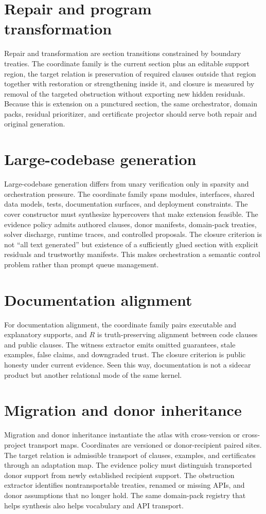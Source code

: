 \documentclass[11pt]{report}
\begin{document}
\section{Repair and program transformation}
Repair and transformation are section transitions constrained by boundary treaties. The coordinate family is the current section plus an editable support region, the target relation is preservation of required clauses outside that region together with restoration or strengthening inside it, and closure is measured by removal of the targeted obstruction without exporting new hidden residuals. Because this is extension on a punctured section, the same orchestrator, domain packs, residual prioritizer, and certificate projector should serve both repair and original generation.
\section{Large-codebase generation}
Large-codebase generation differs from unary verification only in sparsity and orchestration pressure. The coordinate family spans modules, interfaces, shared data models, tests, documentation surfaces, and deployment constraints. The cover constructor must synthesize hypercovers that make extension feasible. The evidence policy admits authored clauses, donor manifests, domain-pack treaties, solver discharge, runtime traces, and controlled proposals. The closure criterion is not ``all text generated'' but existence of a sufficiently glued section with explicit residuals and trustworthy manifests. This makes orchestration a semantic control problem rather than prompt queue management.
\section{Documentation alignment}
For documentation alignment, the coordinate family pairs executable and explanatory supports, and $R$ is truth-preserving alignment between code clauses and public clauses. The witness extractor emits omitted guarantees, stale examples, false claims, and downgraded trust. The closure criterion is public honesty under current evidence. Seen this way, documentation is not a sidecar product but another relational mode of the same kernel.
\section{Migration and donor inheritance}
Migration and donor inheritance instantiate the atlas with cross-version or cross-project transport maps. Coordinates are versioned or donor-recipient paired sites. The target relation is admissible transport of clauses, examples, and certificates through an adaptation map. The evidence policy must distinguish transported donor support from newly established recipient support. The obstruction extractor identifies nontransportable treaties, renamed or missing APIs, and donor assumptions that no longer hold. The same domain-pack registry that helps synthesis also helps vocabulary and API transport.
\end{document}
